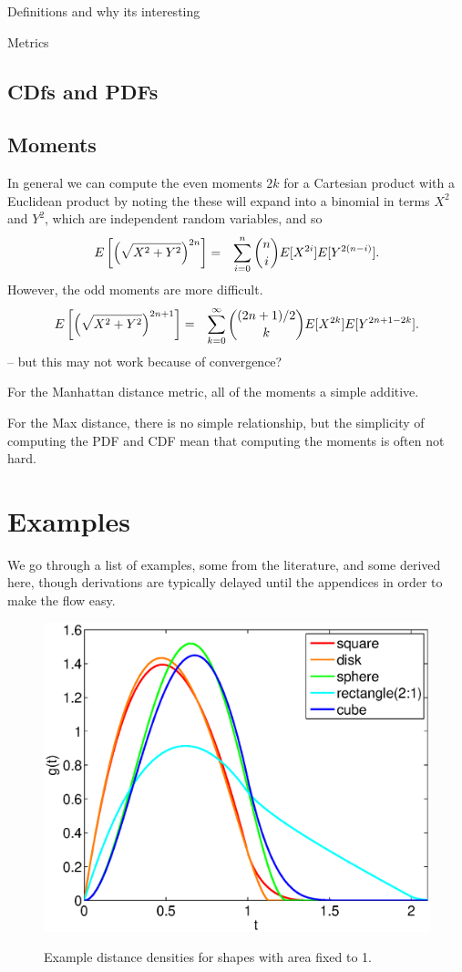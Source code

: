 \documentclass{article}
\begin{document}
Definitions and why its interesting


Metrics

\subsection{CDfs and PDFs}

\subsection{Moments}

In general we can compute the even moments $2k$ for a Cartesian
product with a Euclidean product by noting the these will expand into
a binomial in terms $X^2$ and $Y^2$, which are independent random
variables, and so
\begin{eqnarray}
  E\left[ \left( \sqrt{ X^2 + Y^2} \right)^{2n} \right] 
   & = & \sum_{i=0}^{n} \dbinom{n}{i} E[X^{2i}] E[Y^{2(n-i)}].
\end{eqnarray}
However, the odd moments are more difficult. 
\begin{eqnarray}
  E\left[ \left( \sqrt{ X^2 + Y^2} \right)^{2n+1} \right] 
   & = &  \sum_{k=0}^{\infty}  \dbinom{(2n+1)/2}{k} E[X^{2k}] E[Y^{2n+1-2k}].
\end{eqnarray}
-- but  this may not work because of convergence?


For the Manhattan distance metric, all of the moments a simple
additive.


For the Max distance, there is no simple relationship, but the
simplicity of computing the PDF and CDF mean that computing the
moments is often not hard.



\section{Examples}
\label{sec:known}

We go through a list of examples, some from the literature, and some
derived here, though derivations are typically delayed until the
appendices in order to make the flow easy.

\begin{figure}[htbp]
  \begin{center}
    \includegraphics[width=0.5\columnwidth]{../Matlab/Plots/LinePicking_plot_fix_area.eps}

    \label{fig:various}
    \caption{Example distance densities for shapes with area fixed to 1.}
  \end{center} 
\vspace{-4mm}
\end{figure}
\end{document}
